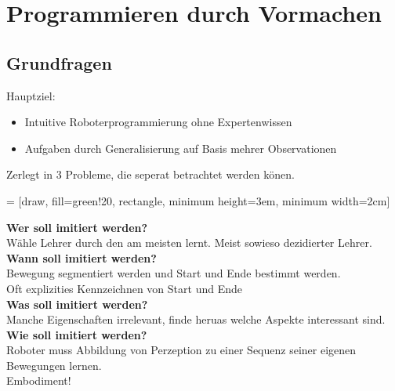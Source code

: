 

\section{Programmieren durch Vormachen}%
\label{pdv:sec:programmieren-durch-vormachen}

\subsection{Grundfragen}%
\label{pdv:sub:grundfragen}
Hauptziel:
\begin{itemize}
\item Intuitive Roboterprogrammierung ohne Expertenwissen
\item Aufgaben durch Generalisierung auf Basis mehrer Observationen
\end{itemize}

Zerlegt in 3 Probleme, die seperat betrachtet werden könen.


 = [draw, fill=green!20, rectangle, 
minimum height=3em, minimum width=2cm]
\begin{figure}[!h]
  \centering
\end{figure}

\textbf{Wer soll imitiert werden?}\\
Wähle Lehrer durch den am meisten lernt. Meist sowieso dezidierter Lehrer.\\

\textbf{Wann soll imitiert werden?}\\
Bewegung segmentiert werden und Start und Ende bestimmt werden.\\
Oft explizities Kennzeichnen von Start und Ende\\

\textbf{Was soll imitiert werden?}\\
Manche Eigenschaften irrelevant, finde heruas welche Aspekte interessant sind.\\

\textbf{Wie soll imitiert werden?}\\
Roboter muss Abbildung von Perzeption zu einer Sequenz seiner eigenen Bewegungen lernen.\\
Embodiment!

